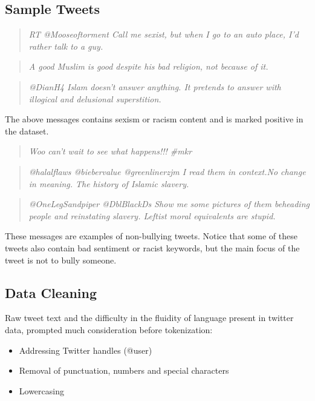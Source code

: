 \documentclass[conference]{IEEEtran}
\begin{document}
\subsection{Sample Tweets}
\begin{quotation}
\emph{RT @Mooseoftorment Call me sexist, but when I go to an auto place, I'd rather talk to a guy.}
\end{quotation}
\begin{quotation}
\emph{A good Muslim is good despite his bad religion, not because of it.}
\end{quotation}
\begin{quotation}
\emph{@DianH4 Islam doesn't answer anything.  It pretends to answer with illogical and delusional superstition.}
\end{quotation}

The above messages contains sexism or racism content and is marked positive in the dataset.

\begin{quotation}
\emph{Woo can't wait to see what happens!!! \#mkr}
\end{quotation}
\begin{quotation}
\emph{@halalflaws @biebervalue @greenlinerzjm I read them in context.No change in meaning. The history of Islamic slavery.}
\end{quotation}
\begin{quotation}
\emph{@OneLegSandpiper @DblBlackDs Show me some pictures of them beheading people and reinstating slavery. Leftist moral equivalents are stupid.}
\end{quotation}

These messages are examples of non-bullying tweets. Notice that some of these tweets also contain bad sentiment or racist keywords, but the main focus of the tweet is not to bully someone.

\subsection{Data Cleaning }

Raw tweet text and the difficulty in the fluidity of language present in twitter data, prompted much consideration before tokenization:

\begin{itemize}
\item Addressing Twitter handles (@user)

\item Removal of punctuation, numbers and special characters

\item Lowercasing
\end{itemize}
\end{document}
